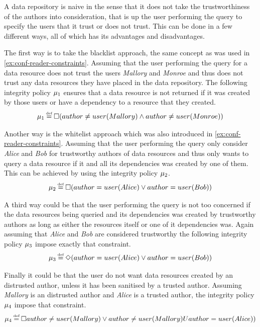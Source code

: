 \begin{example}
A data repository is naive in the sense that it does not take the trustworthiness of the authors into consideration, that is up the user performing the query to specify the users that it trust or does not trust. This can be done in a few different ways, all of which has its advantages and disadvantages.

The first way is to take the blacklist approach, the same concept as was used in \autoref{ex:conf-reader-constraints}. Assuming that the user performing the query for a data resource does not trust the users \emph{Mallory} and \emph{Monroe} and thus does not trust any data resources they have placed in the data repository. The following integrity policy $\mu_1$ ensures that a data resource is not returned if it was created by those users or have a dependency to a resource that they created.
\begin{align*}
    \inte_1 \eqdef \G( author \neq user(Mallory) \land author \neq user(Monroe))
\end{align*}

Another way is the whitelist approach which was also introduced in \autoref{ex:conf-reader-constraints}. Assuming that the user performing the query only consider \emph{Alice} and \emph{Bob} for trustworthy authors of data resources and thus only wants to query a data resource if it and all its dependencies was created by one of them. This can be achieved by using the integrity policy $\mu_2$.
\begin{align*}
    \inte_2 \eqdef \G(author = user(Alice) \lor author = user(Bob))
\end{align*}

A third way could be that the user performing the query is not too concerned if the data resources being queried and its dependencies was created by trustworthy authors as long as either the resources itself or one of it dependencies was. Again assuming that \emph{Alice} and \emph{Bob} are considered trustworthy the following integrity policy $\mu_3$ impose exactly that constraint.
\begin{align*}
    \inte_3 \eqdef \F(author = user(Alice) \lor author = user(Bob))
\end{align*}

Finally it could be that the user do not want data resources created by an distrusted author, unless it has been sanitised by a trusted author. Assuming \emph{Mallory} is an distrusted author and \emph{Alice} is a trusted author, the integrity policy $\mu_4$ impose that constraint.
\begin{align*}
    \inte_4 \eqdef \G author \neq user(Mallory) \lor author \neq user(Mallory) U author = user(Alice))
\end{align*}
\end{example}